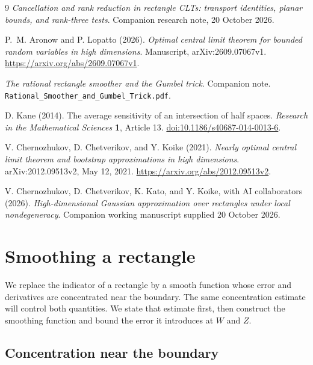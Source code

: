 \documentclass[11pt,letterpaper]{article}
\theoremstyle{remark}
\begin{document}
\begin{thebibliography}{9}
\emph{Cancellation and rank reduction in rectangle CLTs:
transport identities, planar bounds, and rank-three tests}.
Companion research note, 20 October 2026.

P.~M. Aronow and P. Lopatto (2026).
\emph{Optimal central limit theorem for bounded random variables in high dimensions}.
Manuscript, arXiv:2609.07067v1.
\url{https://arxiv.org/abs/2609.07067v1}.

\emph{The rational rectangle smoother and the Gumbel trick}.
Companion note.
\nolinkurl{Rational_Smoother_and_Gumbel_Trick.pdf}.

D. Kane (2014).
The average sensitivity of an intersection of half spaces.
\emph{Research in the Mathematical Sciences} \textbf{1}, Article 13.
\href{https://doi.org/10.1186/s40687-014-0013-6}{doi:10.1186/s40687-014-0013-6}.

V. Chernozhukov, D. Chetverikov, and Y. Koike (2021).
\emph{Nearly optimal central limit theorem and bootstrap approximations
in high dimensions}.
arXiv:2012.09513v2, May 12, 2021.
\url{https://arxiv.org/abs/2012.09513v2}.

V. Chernozhukov, D. Chetverikov, K. Kato, and Y. Koike,
with AI collaborators (2026).
\emph{High-dimensional Gaussian approximation over rectangles under
local nondegeneracy}. Companion working manuscript supplied
20 October 2026.

\end{thebibliography}



\clearpage
\appendix
{}
\section{Smoothing a rectangle}\label{appx-sec:smoothing}

We replace the indicator of a rectangle by a smooth function whose error
and derivatives are concentrated near the boundary.  The same
concentration estimate will control both quantities.  We state that
estimate first, then construct the smoothing function and bound the
error it introduces at \(W\) and \(Z\).

\subsection{Concentration near the boundary}
\end{document}
